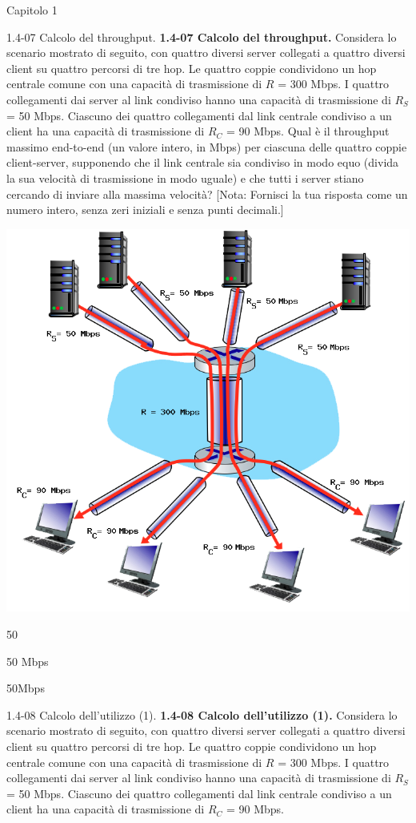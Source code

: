 \documentclass[a4paper]{article}
\begin{document}
\begin{quiz}{Capitolo 1}
\begin{shortanswer}[points=1,shuffle=true]{1.4-07 Calcolo del throughput.}
\textbf{1.4-07 Calcolo del throughput.}
Considera lo scenario mostrato di seguito, con quattro diversi server collegati a quattro diversi client su quattro percorsi di tre hop. Le quattro coppie condividono un hop centrale comune con una capacità di trasmissione di $R$ = 300 Mbps. I quattro collegamenti dai server al link condiviso hanno una capacità di trasmissione di $R_S$ = 50 Mbps. Ciascuno dei quattro collegamenti dal link centrale condiviso a un client ha una capacità di trasmissione di $R_C$ = 90 Mbps. Qual è il throughput massimo end-to-end (un valore intero, in Mbps) per ciascuna delle quattro coppie client-server, supponendo che il link centrale sia condiviso in modo equo (divida la sua velocità di trasmissione in modo uguale) e che tutti i server stiano cercando di inviare alla massima velocità?
[Nota: Fornisci la tua risposta come un numero intero, senza zeri iniziali e senza punti decimali.]
\begin{center}
\includegraphics[width=0.7\linewidth]{figs/1.4.7.png}
\end{center}
\item 50
\item 50 Mbps
\item 50Mbps
\end{shortanswer}

\begin{shortanswer}[points=1,shuffle=true]{1.4-08 Calcolo dell'utilizzo (1).}
\textbf{1.4-08 Calcolo dell'utilizzo (1).}
Considera lo scenario mostrato di seguito, con quattro diversi server collegati a quattro diversi client su quattro percorsi di tre hop. Le quattro coppie condividono un hop centrale comune con una capacità di trasmissione di $R$ = 300 Mbps. I quattro collegamenti dai server al link condiviso hanno una capacità di trasmissione di $R_S$ = 50 Mbps. Ciascuno dei quattro collegamenti dal link centrale condiviso a un client ha una capacità di trasmissione di $R_C$ = 90 Mbps.


\end{shortanswer}
\end{quiz}
\end{document}
